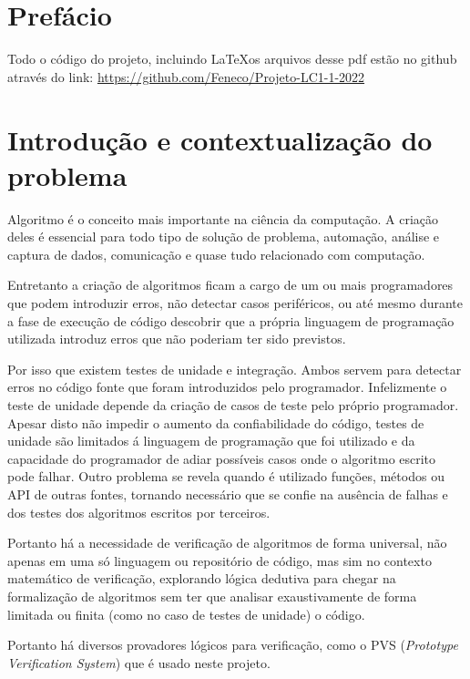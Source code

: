 \chapter{Prefácio}

Todo o código do projeto, incluindo \LaTeX os arquivos desse pdf estão no github através do link: \url{https://github.com/Feneco/Projeto-LC1-1-2022}


\chapter{Introdução e contextualização do problema}

Algoritmo é o conceito mais importante na ciência da computação. A criação deles é essencial para todo tipo de solução de problema, automação, análise e captura de dados, comunicação e quase tudo relacionado com computação.

Entretanto a criação de algoritmos ficam a cargo de um ou mais programadores que podem introduzir erros, não detectar casos periféricos, ou até mesmo durante a fase de execução de código descobrir que a própria linguagem de programação utilizada introduz erros que não poderiam ter sido previstos.

Por isso que existem testes de unidade e integração. Ambos servem para detectar erros no código fonte que foram introduzidos pelo programador. Infelizmente o teste de unidade depende da criação de casos de teste pelo próprio programador. Apesar disto não impedir o aumento da confiabilidade do código, testes de unidade são limitados á linguagem de programação que foi utilizado e da capacidade do programador de adiar possíveis casos onde o algoritmo escrito pode falhar. Outro problema se revela quando é utilizado funções, métodos ou API de outras fontes, tornando necessário que se confie na ausência de falhas e dos testes dos algoritmos escritos por terceiros.

Portanto há a necessidade de verificação de algoritmos de forma universal, não apenas em uma só linguagem ou repositório de código, mas sim no contexto matemático de verificação, explorando lógica dedutiva para chegar na formalização de algoritmos sem ter que analisar exaustivamente de forma limitada ou finita (como no caso de testes de unidade) o código.

Portanto há diversos provadores lógicos para verificação, como o PVS (\textit{Prototype Verification System}) que é usado neste projeto.

